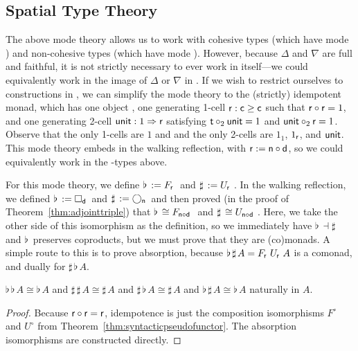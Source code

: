 \documentclass{drl-common/llncs}
\newcommand{\la}{\ensuremath{\dashv}}
\newcommand{\tc}[2]{\ensuremath{#1 \Rightarrow #2}}
\newcommand\compo[2]{\ensuremath{#1 \circ #2}}
\newcommand\comph[2]{\ensuremath{#1 \mathbin{\circ_2} #2}}
\newcommand\F[2]{\ensuremath{F_{#1} \,\, #2}}
\newcommand\U[2]{\ensuremath{U_{#1} \,\, #2}}
\newcommand\Bx[2]{\ensuremath{\Box_{#1} \, {#2}}}
\newcommand\Crc[2]{\ensuremath{\bigcirc_{#1} \, {#2}}}
\newcommand\Flat[1]{\ensuremath{\flat \, {#1}}}
\newcommand\Sharp[1]{\ensuremath{\sharp \, {#1}}}
\newcommand\iso{\cong}
\begin{document}
\subsection{Spatial Type Theory}
\label{sec:idempotent}

The above mode theory allows us to work with cohesive types (which have
mode ) and non-cohesive types (which have mode ).
However, because $\Delta$ and $\nabla$ are full and faithful, it is not
strictly necessary to ever work in  itself---we could
equivalently work in the image of $\Delta$ or $\nabla$ in .  If
we wish to restrict ourselves to constructions in , we can
simplify the mode theory to the (strictly) idempotent monad, which has
one object , one generating 1-cell $\mathsf{r} : \mathsf{c} \ge
\mathsf{c}$ such that $\compo{\dsd{r}}{\dsd{r}} = 1$, and one generating
2-cell $\dsd{unit} : \tc{1}{\dsd{r}}$ satisfying $\comph{\dsd
  t}{\dsd{unit}} = 1$ and $\comph{\dsd{unit}}{\dsd{r}} = 1$.  Observe
that the only 1-cells are $1$ and  and the only 2-cells are
$1_1$, $1_{\mathsf{r}}$, and $\mathsf{unit}$.  This mode theory embeds in the
walking reflection, with $\dsd{r} := \compo{\dsd{n}}{\dsd{d}}$, so we
could equivalently work in the -types above.

For this mode theory, we define $\Flat{} := \F{\dsd{r}}{}$ and $\Sharp{}
:= \U{\dsd{r}}{}$.  In the walking reflection, we defined $\Flat{} :=
\Bx{\dsd{d}}{}$ and $\Sharp{} := \Crc{\dsd{n}}{}$ and then proved (in
the proof of Theorem~\ref{thm:adjointtriple}) that $\Flat{} \iso
\F{\compo{\dsd n}{\dsd d}}$ and $\Sharp{} \iso \U{\compo{\dsd n}{\dsd
    d}}$. Here, we take the other side of this isomorphism as the
definition, so we immediately have $\Flat{} \la \Sharp{}$ and $\Flat{}$
preserves coproducts, but we must prove that they are (co)monads.  A
simple route to this is to prove absorption, because $\Flat{\Sharp A} =
\F{\dsd{r}}{\U{\dsd{r}}{A}}$ is a comonad, and dually for $\Sharp{\Flat
  A}$.  

\begin{theorem}
 $\Flat{\Flat A} \iso \Flat A$ and $\Sharp{\Sharp A} \iso \Sharp A$
and $\Sharp{\Flat A} \iso \Sharp{A}$ 
and $\Flat{\Sharp A} \iso \Flat{A}$ naturally in $A$.
\end{theorem}
\begin{proof}
Because $\compo{\dsd r}{\dsd r} = {\dsd r}$, idempotence is just the
composition isomorphisms $F^\circ$ and $U^\circ$ from
Theorem~\ref{thm:syntacticpseudofunctor}.  The absorption isomorphisms
are constructed directly.
\end{proof}
\end{document}
